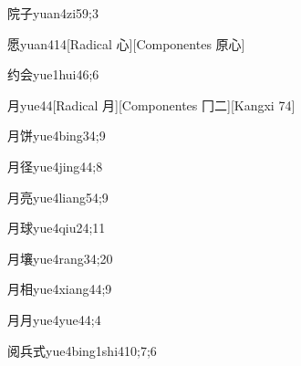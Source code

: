 \begin{verbete}{院子}{yuan4zi5}{9;3}
\end{verbete}

\begin{verbete}{愿}{yuan4}{14}[Radical 心][Componentes 原心]
\end{verbete}

\begin{verbete}{约会}{yue1hui4}{6;6}
\end{verbete}

\begin{verbete}{月}{yue4}{4}[Radical 月][Componentes 冂二][Kangxi 74]
\end{verbete}

\begin{verbete}{月饼}{yue4bing3}{4;9}
\end{verbete}

\begin{verbete}{月径}{yue4jing4}{4;8}
\end{verbete}

\begin{verbete}{月亮}{yue4liang5}{4;9}
\end{verbete}

\begin{verbete}{月球}{yue4qiu2}{4;11}
\end{verbete}

\begin{verbete}{月壤}{yue4rang3}{4;20}
\end{verbete}

\begin{verbete}{月相}{yue4xiang4}{4;9}
\end{verbete}

\begin{verbete}{月月}{yue4yue4}{4;4}
\end{verbete}

\begin{verbete}{阅兵式}{yue4bing1shi4}{10;7;6}
\end{verbete}

